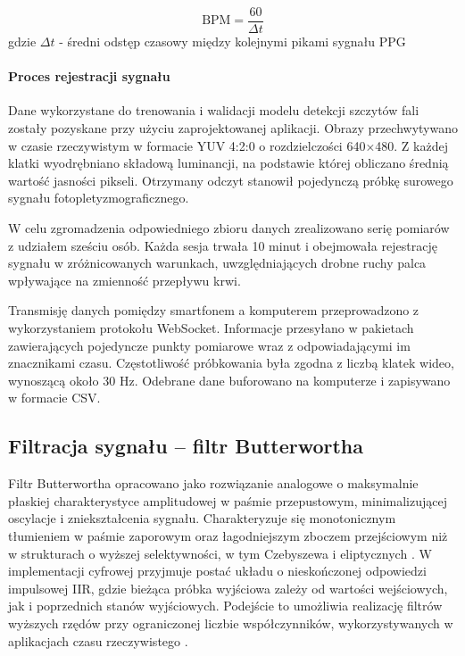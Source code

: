 \documentclass[journal]{IEEEtran}
\begin{document}
\begin{equation}
\text{BPM} = \frac{60}{\Delta t}
\label{eq:bpm}
\end{equation}
gdzie $\Delta t$  - średni odstęp czasowy między kolejnymi pikami sygnału PPG

\paragraph{Proces rejestracji sygnału}
Dane wykorzystane do trenowania i walidacji modelu detekcji szczytów fali zostały pozyskane przy użyciu zaprojektowanej aplikacji. Obrazy przechwytywano w czasie rzeczywistym w formacie YUV 4:2:0 o rozdzielczości 640×480. Z każdej klatki wyodrębniano składową luminancji, na podstawie której obliczano średnią wartość jasności pikseli. Otrzymany odczyt stanowił pojedynczą próbkę surowego sygnału fotopletyzmograficznego.

W celu zgromadzenia odpowiedniego zbioru danych zrealizowano serię pomiarów z udziałem sześciu osób. Każda sesja trwała 10 minut i obejmowała rejestrację sygnału w zróżnicowanych warunkach, uwzględniających drobne ruchy palca wpływające na zmienność przepływu krwi.

Transmisję danych pomiędzy smartfonem a komputerem przeprowadzono z wykorzystaniem protokołu WebSocket. Informacje przesyłano w pakietach zawierających pojedyncze punkty pomiarowe wraz z odpowiadającymi im znacznikami czasu. Częstotliwość próbkowania była zgodna z liczbą klatek wideo, wynoszącą około 30 Hz. Odebrane dane buforowano na komputerze i zapisywano w formacie CSV.

\newpage
\subsection{Filtracja sygnału – filtr Butterwortha}
Filtr Butterwortha opracowano jako rozwiązanie analogowe o maksymalnie płaskiej charakterystyce amplitudowej w paśmie przepustowym, minimalizującej oscylacje i zniekształcenia sygnału. Charakteryzuje się monotonicznym tłumieniem w paśmie zaporowym oraz łagodniejszym zboczem przejściowym niż w strukturach o wyższej selektywności, w tym Czebyszewa i eliptycznych \cite{8}. W implementacji cyfrowej przyjmuje postać układu o nieskończonej odpowiedzi impulsowej IIR, gdzie bieżąca próbka wyjściowa zależy od wartości wejściowych, jak i poprzednich stanów wyjściowych. Podejście to umożliwia realizację filtrów wyższych rzędów przy ograniczonej liczbie współczynników, wykorzystywanych w aplikacjach czasu rzeczywistego \cite{9}.
\end{document}
